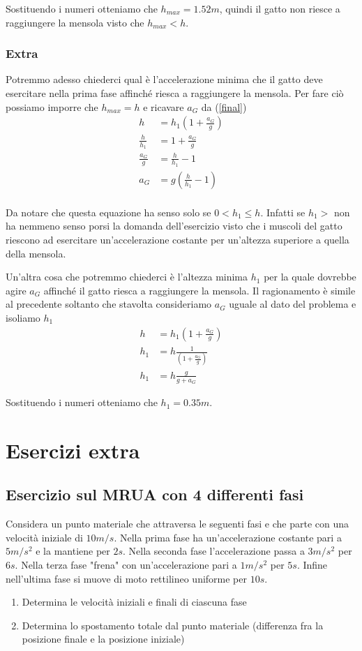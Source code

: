 \documentclass{article}
\begin{document}
Sostituendo i numeri otteniamo che $h_{max} = 1.52m$, quindi il gatto non riesce a raggiungere la mensola visto che $h_{max} < h$.

\subsubsection*{Extra}

Potremmo adesso chiederci qual è l'accelerazione minima che il gatto deve esercitare nella prima fase affinché riesca a raggiungere la mensola.
Per fare ciò possiamo imporre che $h_{max}=h$ e ricavare $a_G$ da (\ref{final})
\begin{align}
  h &= h_1\left(1+\frac{a_G}{g}\right) \\
  \frac{h}{h_1} &= 1+\frac{a_G}{g} \\
  \frac{a_G}{g} &= \frac{h}{h_1} -1 \\
  a_G &= g \left(\frac{h}{h_1} -1\right) \\
\end{align}

Da notare che questa equazione ha senso solo se $0 < h_1 \le h$. Infatti se $h_1 >$ non ha nemmeno senso porsi la domanda dell'esercizio visto che i muscoli del gatto riescono ad esercitare un'accelerazione costante per un'altezza superiore a quella della mensola.

Un'altra cosa che potremmo chiederci è l'altezza minima $h_1$ per la quale dovrebbe agire $a_G$ affinché il gatto riesca a raggiungere la mensola. Il ragionamento è simile al precedente soltanto che stavolta consideriamo $a_G$ uguale al dato del problema e isoliamo $h_1$
\begin{align}
  h &= h_1\left(1+\frac{a_G}{g}\right) \\
  h_1 &= h \frac{1}{\left(1+\frac{a_G}{g}\right)} \\
  h_1 &= h \frac{g}{g+a_G}
\end{align}

Sostituendo i numeri otteniamo che $h_1=0.35m$.

\newpage
\section{Esercizi extra}

\subsection{Esercizio sul MRUA con 4 differenti fasi}
Considera un punto materiale che attraversa le seguenti fasi e che parte con una velocità iniziale di $10m/s$. 
Nella prima fase ha un'accelerazione costante pari a $5m/s^2$ e la mantiene per $2s$. Nella seconda fase l'accelerazione passa a $3m/s^2$ per $6s$. Nella terza fase "frena" con un'accelerazione pari a $1m/s^2$ per $5s$. Infine nell'ultima fase si muove di moto rettilineo uniforme per $10s$.
\begin{enumerate}
  \item Determina le velocità iniziali e finali di ciascuna fase
  \item Determina lo spostamento totale dal punto materiale (differenza fra la posizione finale e la posizione iniziale)
\end{enumerate}
\end{document}
